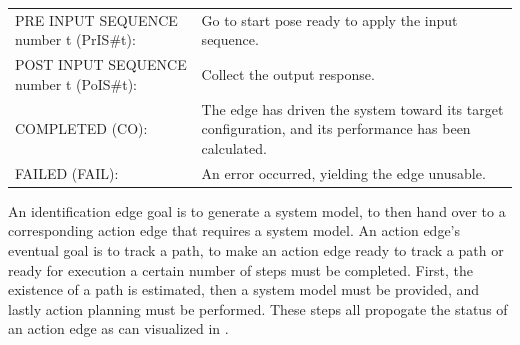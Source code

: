 \noindent
\begin{table}[H]
\centering
\begin{tabular}%
  {>{\raggedleft\arraybackslash}p{}%
   >{\raggedright\arraybackslash}p{}}
PRE INPUT SEQUENCE number t (PrIS\#t): & Go to start pose ready to apply the input sequence. \\
POST INPUT SEQUENCE number t (PoIS\#t): & Collect the output response. \\
COMPLETED (CO): & The edge has driven the system toward its target configuration, and its performance has been calculated. \\
FAILED (FAIL): & An error occurred, yielding the edge unusable. \\
\end{tabular}
\end{table}

An identification edge goal is to generate a system model, to then hand over to a corresponding action edge that requires a system model. An action edge's eventual goal is to track a path, to make an action edge ready to track a path or ready for execution a certain number of steps must be completed. First, the existence of a path is estimated, then a system model must be provided, and lastly action planning must be performed. These steps all propogate the status of an action edge as can visualized in .\bs

